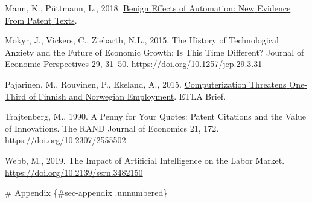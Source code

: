 \documentclass[
  11,
  a4paperpaper,
]{article}
\newlength{\cslhangindent}
\newenvironment{CSLReferences}[2] %
 {\begin{list}{}{%
  \setlength{\itemindent}{0pt}
  \setlength{\leftmargin}{0pt}
  \setlength{\parsep}{0pt}
  \ifodd #1
   \setlength{\leftmargin}{\cslhangindent}
   \setlength{\itemindent}{-1\cslhangindent}
  \fi
  \setlength{\itemsep}{#2\baselineskip}}}
 {\end{list}}
\begin{document}
\begin{CSLReferences}{1}{0}
Mann, K., Püttmann, L., 2018.
\href{https://ssrn.com/abstract=2959584}{Benign {Effects} of
{Automation}: {New} {Evidence} {From} {Patent} {Texts}}.

Mokyr, J., Vickers, C., Ziebarth, N.L., 2015. The {History} of
{Technological} {Anxiety} and the {Future} of {Economic} {Growth}: {Is}
{This} {Time} {Different}? Journal of Economic Perspectives 29, 31--50.
\url{https://doi.org/10.1257/jep.29.3.31}

Pajarinen, M., Rouvinen, P., Ekeland, A., 2015.
\href{https://ideas.repec.org//p/rif/briefs/34.html}{Computerization
{Threatens} {One}-{Third} of {Finnish} and {Norwegian} {Employment}}.
ETLA Brief.

Trajtenberg, M., 1990. A {Penny} for {Your} {Quotes}: {Patent}
{Citations} and the {Value} of {Innovations}. The RAND Journal of
Economics 21, 172. \url{https://doi.org/10.2307/2555502}

Webb, M., 2019. The {Impact} of {Artificial} {Intelligence} on the
{Labor} {Market}. \url{https://doi.org/10.2139/ssrn.3482150}

\end{CSLReferences}

\newpage{} \# Appendix \{\#sec-appendix .unnumbered\}
\end{document}
